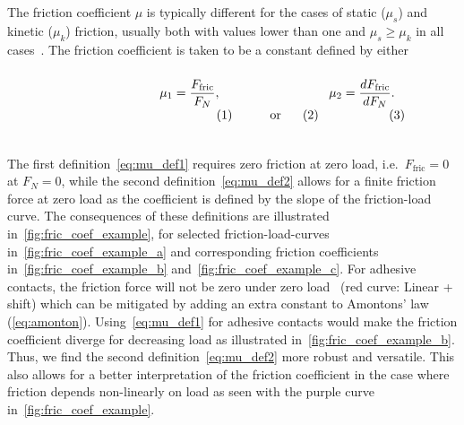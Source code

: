 The friction coefficient $\mu$ is typically different for the cases of static
($\mu_s$) and kinetic ($\mu_k$) friction, usually both with values lower than
one and $\mu_s \ge \mu_k$ in all cases~\cite[p. 6]{gnecco_meyer_2015}. The friction coefficient is taken to be a constant defined by either~\cite{gao_frictional_2004} \\
\vspace{0.1cm}
\begin{subequations}
\noindent\begin{minipage}{.2\linewidth}
  \hfill
\end{minipage}
\begin{minipage}[b]{0.2\linewidth}
  \begin{align}
    \mu_1 = \frac{F_{\text{fric}}}{F_N},
    \label{eq:mu_def1}
  \end{align}
\end{minipage}
\begin{minipage}[b]{0.2\linewidth}
  \begin{align*}
    \text{or}
  \end{align*}
\end{minipage}
\begin{minipage}[b]{0.2\linewidth}
  \begin{align}
    \mu_2 = \frac{dF_{\text{fric}}}{dF_N}.
    \label{eq:mu_def2}
  \end{align}
\end{minipage}
\begin{minipage}{.2\linewidth}
\end{minipage}
\label{eq:mu_def}
\end{subequations}
\vspace{0.1cm}
\\
\noindent The first definition~\cref{eq:mu_def1} requires zero friction at zero
load, i.e.\ $F_{\text{fric}} = 0$ at $F_N = 0$, while the second definition~\cref{eq:mu_def2} allows for a finite friction force at zero load as the
coefficient is defined by the slope of the friction-load curve. The
consequences of these definitions are illustrated in~\cref{fig:fric_coef_example}, for selected friction-load-curves in~\cref{fig:fric_coef_example_a} and corresponding friction coefficients in~\cref{fig:fric_coef_example_b} and~\cref{fig:fric_coef_example_c}. For adhesive
contacts, the friction force will not be zero under zero load~\cite{gao_frictional_2004} (red curve: Linear
+ shift) which can be mitigated by adding an extra constant to Amontons’ law (\cref{eq:amonton}). Using~\cref{eq:mu_def1} for adhesive contacts would make the friction coefficient diverge for decreasing load as illustrated in~\cref{fig:fric_coef_example_b}. Thus, we find the second
definition~\cref{eq:mu_def2} more robust and versatile. This also allows for a better interpretation of the friction coefficient in the case where
friction depends non-linearly on load as seen with the purple curve in~\cref{fig:fric_coef_example}. 


